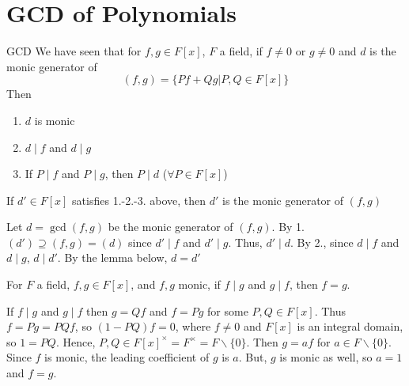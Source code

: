 \documentclass[12pt, a4paper, twoside, openright, titlepage]{book}
\begin{document}
\section{\textsection GCD of Polynomials}

\begin{defn}{GCD}{}
        We have seen that for $f,g \in F[x]$, $F$ a field, if $f \neq 0$ or $g \neq 0$ and $d$ is the monic generator of \begin{equation}
                (f,g) = \{Pf+Qg\vert P,Q\in F[x]\}
        \end{equation}
        Then \begin{enumerate}
                \item $d$ is monic
                \item $d\;\vert\;f$ and $d\;\vert\;g$
                \item If $P\;\vert\;f$ and $P\;\vert\;g$, then $P\;\vert\;d$ ($\forall P \in F[x]$)
        \end{enumerate}
\end{defn}

\begin{rmk}{}{}
        If $d' \in F[x]$ satisfies 1.-2.-3. above, then $d'$ is the monic generator of $(f,g)$
\end{rmk}
\begin{proof*}{}{}
        Let $d = \gcd(f,g)$ be the monic generator of $(f,g)$. By 1. $(d') \supseteq (f,g) = (d)$ since $d'\;\vert\;f$ and $d'\;\vert\;g$. Thus, $d'\;\vert\;d$. By 2., since $d\;\vert\;f$ and $d\;\vert\;g$, $d\;\vert\;d'$. By the lemma below, $d = d'$
\end{proof*}

\begin{lem}{}{}
        For $F$ a field, $f,g \in F[x]$, and $f,g$ monic, if $f\;\vert\;g$ and $g\;\vert\;f$, then $f = g$.
\end{lem}
\begin{proof*}{}{}
        If $f\;\vert\;g$ and $g\;\vert\;f$ then $g = Qf$ and $f = Pg$ for some $P,Q \in F[x]$. Thus $f = Pg = PQf$, so $(1-PQ)f = 0$, where $f \neq 0$ and $F[x]$ is an integral domain, so $1 = PQ$. Hence, $P,Q \in F[x]^{\times} = F^{\times} = F\backslash\{0\}$. Then $g = af$ for $a \in F\backslash\{0\}$. Since $f$ is monic, the leading coefficient of $g$ is $a$. But, $g$ is monic as well, so $a = 1$ and $f = g$.
\end{proof*}
\end{document}
